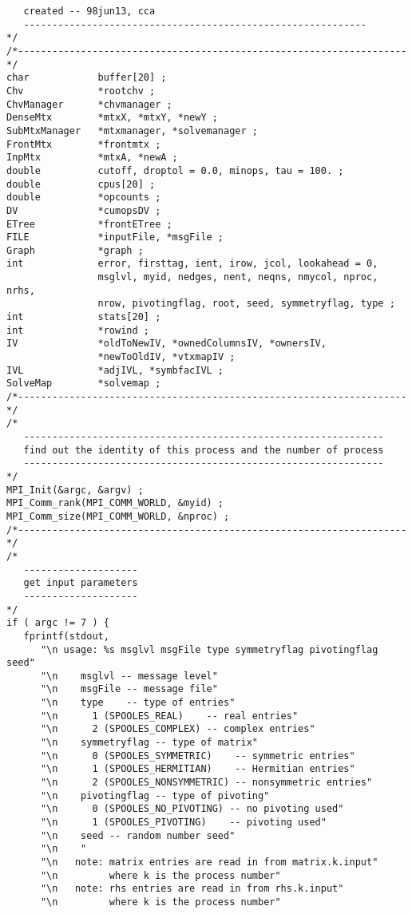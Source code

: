 \begin{verbatim}
   created -- 98jun13, cca
   ------------------------------------------------------------
*/
/*--------------------------------------------------------------------*/
char            buffer[20] ;
Chv             *rootchv ;
ChvManager      *chvmanager ;
DenseMtx        *mtxX, *mtxY, *newY ;
SubMtxManager   *mtxmanager, *solvemanager ;
FrontMtx        *frontmtx ;
InpMtx          *mtxA, *newA ;
double          cutoff, droptol = 0.0, minops, tau = 100. ;
double          cpus[20] ;
double          *opcounts ;
DV              *cumopsDV ;
ETree           *frontETree ;
FILE            *inputFile, *msgFile ;
Graph           *graph ;
int             error, firsttag, ient, irow, jcol, lookahead = 0, 
                msglvl, myid, nedges, nent, neqns, nmycol, nproc, nrhs,
                nrow, pivotingflag, root, seed, symmetryflag, type ;
int             stats[20] ;
int             *rowind ;
IV              *oldToNewIV, *ownedColumnsIV, *ownersIV, 
                *newToOldIV, *vtxmapIV ;
IVL             *adjIVL, *symbfacIVL ;
SolveMap        *solvemap ;
/*--------------------------------------------------------------------*/
/*
   ---------------------------------------------------------------
   find out the identity of this process and the number of process
   ---------------------------------------------------------------
*/
MPI_Init(&argc, &argv) ;
MPI_Comm_rank(MPI_COMM_WORLD, &myid) ;
MPI_Comm_size(MPI_COMM_WORLD, &nproc) ;
/*--------------------------------------------------------------------*/
/*
   --------------------
   get input parameters
   --------------------
*/
if ( argc != 7 ) {
   fprintf(stdout, 
      "\n usage: %s msglvl msgFile type symmetryflag pivotingflag seed"
      "\n    msglvl -- message level"
      "\n    msgFile -- message file"
      "\n    type    -- type of entries"
      "\n      1 (SPOOLES_REAL)    -- real entries"
      "\n      2 (SPOOLES_COMPLEX) -- complex entries"
      "\n    symmetryflag -- type of matrix"
      "\n      0 (SPOOLES_SYMMETRIC)    -- symmetric entries"
      "\n      1 (SPOOLES_HERMITIAN)    -- Hermitian entries"
      "\n      2 (SPOOLES_NONSYMMETRIC) -- nonsymmetric entries"
      "\n    pivotingflag -- type of pivoting"
      "\n      0 (SPOOLES_NO_PIVOTING) -- no pivoting used"
      "\n      1 (SPOOLES_PIVOTING)    -- pivoting used"
      "\n    seed -- random number seed"
      "\n    "
      "\n   note: matrix entries are read in from matrix.k.input"
      "\n         where k is the process number"
      "\n   note: rhs entries are read in from rhs.k.input"
      "\n         where k is the process number"

\end{verbatim}
